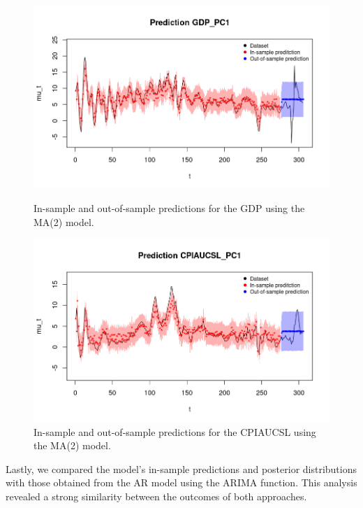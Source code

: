 \begin{figure}[H]
    \centering
    \begin{minipage}{0.49\textwidth}
        \centering
        \includegraphics[width=\textwidth]{images/3-MA/gdp_prediction2.png}
        \caption{In-sample and out-of-sample predictions for the GDP using the MA(2) model.}
        \label{fig:MA2_gdp_prediction}
    \end{minipage}\hfill
    \begin{minipage}{0.49\textwidth}
        \centering
        \includegraphics[width=\textwidth]{images/3-MA/infl_prediction2.png}
        \caption{In-sample and out-of-sample predictions for the CPIAUCSL using the MA(2) model.}
        \label{fig:MA2_infl_prediction}
    \end{minipage}
\end{figure}
Lastly, we compared the model's in-sample predictions and posterior distributions with those obtained from the AR model using the ARIMA function. This analysis revealed a strong similarity between the outcomes of both approaches.
